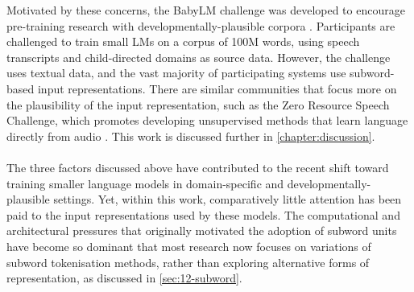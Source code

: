 
Motivated by these concerns, the BabyLM challenge was developed to encourage pre-training research with developmentally-plausible corpora \citep{warstadt2023findings, hu-etal-2024-findings}. Participants are challenged to train small LMs on a corpus of 100M words, using speech transcripts and child-directed domains as source data. However, the challenge uses textual data, and the vast majority of participating systems use subword-based input representations. There are similar communities that focus more on the plausibility of the input representation, such as the Zero Resource Speech Challenge, which promotes developing unsupervised methods that learn language directly from audio \citep{dunbar_self-supervised_2022}. This work is discussed further in \cref{chapter:discussion}.

\paragraph{} The three factors discussed above have contributed to the recent shift toward training smaller language models in domain-specific and developmentally-plausible settings. Yet, within this work, comparatively little attention has been paid to the input representations used by these models. The computational and architectural pressures that originally motivated the adoption of subword units have become so dominant that most research now focuses on variations of subword tokenisation methods, rather than exploring alternative forms of representation, as discussed in \cref{sec:12-subword}.

